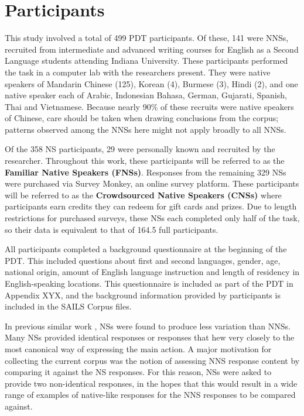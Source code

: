 \section{Participants}
\label{sec:participants}

This study involved a total of 499 PDT participants. Of these, 141 were NNSs, recruited from intermediate and advanced writing courses for English as a Second Language students attending Indiana University. These participants performed the task in a computer lab with the researchers present. They were native speakers of Mandarin Chinese (125), Korean (4), Burmese (3), Hindi (2), and one native speaker each of Arabic, Indonesian Bahasa, German, Gujarati, Spanish, Thai and Vietnamese. Because nearly 90\% of these recruits were native speakers of Chinese, care should be taken when drawing conclusions from the corpus; patterns observed among the NNSs here might not apply broadly to all NNSs. 

Of the 358 NS participants, 29 were personally known and recruited by the researcher. Throughout this work, these participants will be referred to as the \textbf{Familiar Native Speakers (FNSs)}. Responses from the remaining 329 NSs were purchased via Survey Monkey, an online survey platform. These participants will be referred to as the \textbf{Crowdsourced Native Speakers (CNSs)} where participants earn credits they can redeem for gift cards and prizes. Due to length restrictions for purchased surveys, these NSs each completed only half of the task, so their data is equivalent to that of 164.5 full participants.

All participants completed a background questionnaire at the beginning of the PDT. This included questions about first and second languages, gender, age, national origin, amount of English language instruction and length of residency in English-speaking locations. This questionnaire is included as part of the PDT in Appendix XYX, and the background information provided by participants is included in the SAILS Corpus files. 

In previous similar work \citep{king:dickinson:13},
NSs were found to produce less variation than NNSs. Many NSs provided identical responses or responses that hew very closely to the most canonical way of expressing the main action. A major motivation for collecting the current corpus was the notion of assessing NNS response content by comparing it against the NS responses. For this reason, NSs were asked to provide two non-identical responses, in the hopes that this would result in a wide range of examples of native-like responses for the NNS responses to be compared against.

